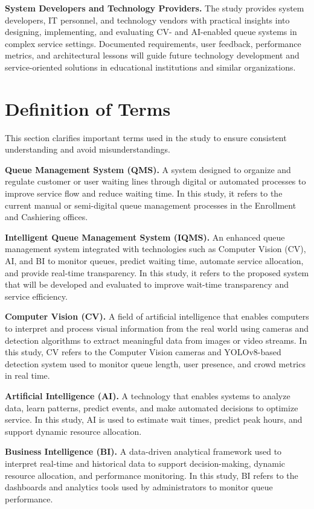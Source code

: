 \documentclass{research}
\begin{document}
\textbf {System Developers and Technology Providers.} The study provides system developers, IT personnel, and technology vendors with practical insights into designing, implementing, and evaluating CV- and AI-enabled queue systems in complex service settings. Documented requirements, user feedback, performance metrics, and architectural lessons will guide future technology development and service-oriented solutions in educational institutions and similar organizations.

\section{Definition of Terms}

This section clarifies important terms used in the study to ensure consistent understanding and avoid misunderstandings.

\textbf {Queue Management System (QMS).} A system designed to organize and regulate customer or user waiting lines through digital or automated processes to improve service flow and reduce waiting time. In this study, it refers to the current manual or semi-digital queue management processes in the Enrollment and Cashiering offices.

\textbf {Intelligent Queue Management System (IQMS).} An enhanced queue management system integrated with technologies such as Computer Vision (CV), AI, and BI to monitor queues, predict waiting time, automate service allocation, and provide real-time transparency. In this study, it refers to the proposed system that will be developed and evaluated to improve wait-time transparency and service efficiency.

\textbf {Computer Vision (CV).} A field of artificial intelligence that enables computers to interpret and process visual information from the real world using cameras and detection algorithms to extract meaningful data from images or video streams. In this study, CV refers to the Computer Vision cameras and YOLOv8-based detection system used to monitor queue length, user presence, and crowd metrics in real time.

\textbf {Artificial Intelligence (AI).} A technology that enables systems to analyze data, learn patterns, predict events, and make automated decisions to optimize service. In this study, AI is used to estimate wait times, predict peak hours, and support dynamic resource allocation.

\textbf {Business Intelligence (BI).} A data-driven analytical framework used to interpret real-time and historical data to support decision-making, dynamic resource allocation, and performance monitoring. In this study, BI refers to the dashboards and analytics tools used by administrators to monitor queue performance.
\end{document}
